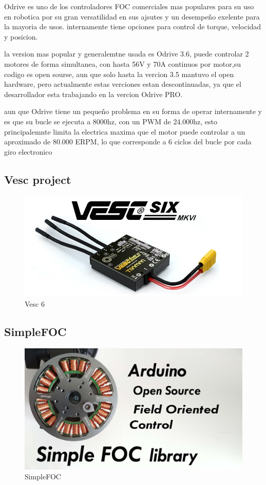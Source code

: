 \documentclass[11pt]{report}
\begin{document}
Odrive es uno de los controladores FOC comerciales mas populares para su uso en robotica por su gran versatilidad en sus ajsutes y un desempeño exelente para la mayoria de usos. internamente tiene opciones para control de torque, velocidad y posicion.

la version mas popular y generalemtne usada es Odrive 3.6, puede controlar 2 motores de forma simultanea, con hasta 56V y 70A continuos por motor,su codigo es open sourse, aun que solo hasta la vercion 3.5 mantuvo el open hardware, pero actualmente estas verciones estan descontinuadas, ya que el desarrollador esta trabajando en la vercion Odrive PRO.

aun que Odrive tiene un pequeño problema en su forma de operar internamente y es que su bucle se ejecuta a 8000hz, con un PWM de 24.000hz, esto principalemnte limita la electrica maxima que el motor puede controlar a un aproximado de 80.000 ERPM, lo que corresponde a 6 ciclos del bucle por cada giro electronico

\subsection{Vesc project}
\begin{figure}[ht]
	\centering
	\includegraphics[scale=0.5]{imagenes/Vesc.jpg}
	\caption{Vesc 6}
\end{figure}
\FloatBarrier


\subsection{SimpleFOC}
\begin{figure}[ht]
	\centering
	\includegraphics[scale=0.05]{imagenes/simpleFOC.jpeg}
	\caption{SimpleFOC}
\end{figure}
\FloatBarrier
\end{document}
